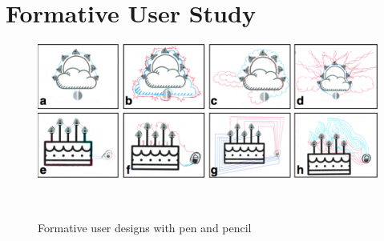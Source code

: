 \documentclass{sigchi}
\begin{document}




\section{Formative User Study}
\begin{figure}
\centering
  \includegraphics[width=1\columnwidth]{figures/Ellustrate_figures_formative_user_design}
  \caption{Formative user designs with pen and pencil}~\label{fig:formative_user_design}
\end{figure}
\end{document}
